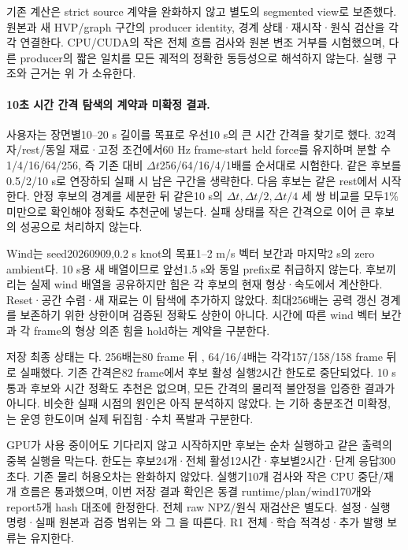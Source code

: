 \documentclass[10pt]{article}
\begin{document}
기존 계산은 strict source 계약을 완화하지 않고 별도의 segmented view로 보존했다.
원본과 새 HVP/graph 구간의 producer identity, 경계 상태·재시작·원식 검산을 각각 연결한다.
CPU/CUDA의 작은 전체 흐름 검사와 원본 변조 거부를 시험했으며, 다른 producer의 짧은 일치를
모든 궤적의 정확한 동등성으로 해석하지 않는다. 실행 구조와 근거는 위 가 소유한다.

\paragraph{10초 시간 간격 탐색의 계약과 미확정 결과.}
\label{sec:r1-ten-second-timestep}
사용자는 장면별10--20 s 길이를 목표로 우선10 s의 큰 시간 간격을 찾기로 했다.
32격자/rest/동일 재료·고정 조건에서60 Hz frame-start held force를 유지하며
분할 수1/4/16/64/256, 즉 기존 대비 \(\Delta t\)256/64/16/4/1배를 순서대로 시험한다.
같은 후보를0.5/2/10 s로 연장하되 실패 시 남은 구간을 생략한다. 다음 후보는 같은 rest에서 시작한다.
안정 후보의 경계를 세분한 뒤 같은10 s의 \(\Delta t,\Delta t/2,\Delta t/4\) 세 쌍 비교를
모두1\% 미만으로 확인해야 정확도 추천군에 넣는다. 실패 상태를 작은 간격으로 이어 큰 후보의 성공으로 처리하지 않는다.

Wind는 seed20260909,0.2 s knot의 목표1--2 m/s 벡터 보간과 마지막2 s의 zero ambient다.
10 s용 새 배열이므로 앞선1.5 s와 동일 prefix로 취급하지 않는다. 후보끼리는 실제 wind 배열을
공유하지만 힘은 각 후보의 현재 형상·속도에서 계산한다. Reset·공간 수렴·새 재료는 이 탐색에 추가하지 않았다.
최대256배는 공력 갱신 경계를 보존하기 위한 상한이며 검증된 정확도 상한이 아니다.
시간에 따른 wind 벡터 보간과 각 frame의 형상 의존 힘을 hold하는 계약을 구분한다.

저장 최종 상태는 다. 256배는80 frame 뒤 ,
64/16/4배는 각각157/158/158 frame 뒤 로 실패했다.
기존 간격은82 frame에서 후보 활성 실행2시간 한도로 중단되었다.
10 s 통과 후보와 시간 정확도 추천은 없으며, 모든 간격의 물리적 불안정을 입증한 결과가 아니다.
비슷한 실패 시점의 원인은 아직 분석하지 않았다. 는 기하 충분조건 미확정,
는 운영 한도이며 실제 뒤집힘·수치 폭발과 구분한다.

GPU가 사용 중이어도 기다리지 않고 시작하지만 후보는 순차 실행하고 같은 출력의 중복 실행을 막는다.
한도는 후보24개·전체 활성12시간·후보별2시간·단계 응답300초다. 기존 물리 허용오차는 완화하지 않았다.
실행기10개 검사와 작은 CPU 중단/재개 흐름은 통과했으며, 이번 저장 결과 확인은
동결 runtime/plan/wind170개와 report5개 hash 대조에 한정한다. 전체 raw NPZ/원식 재검산은 별도다.
설정·실행 명령·실패 원본과 검증 범위는
와 그
을 따른다. R1 전체·학습 적격성·추가 발행 보류는 유지한다.
\end{document}
